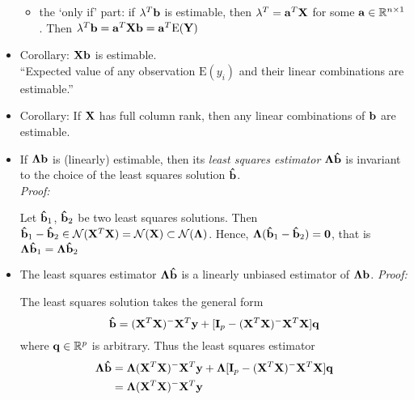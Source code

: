 \begin{itemize}
\begin{pf}
\begin{itemize}
			\item the `only if' part: if $\mathbf{\lambda}^T \mathbf{b}$ is estimable, then $\mathbf{\lambda}^T = \mathbf{a}^T\mathbf{X}$ for some $\mathbf{a} \in \mathbb{R}^{n \times 1}$. Then $\mathbf{\lambda}^T \mathbf{b} = \mathbf{a}^T\mathbf{Xb} = \mathbf{a}^T \mbox{E}(\mathbf{Y})$
		\end{itemize}
	\end{pf}
	\item Corollary: $\mathbf{Xb}$ is estimable.\\
	``Expected value of any observation $\mbox{E}(y_i)$ and their linear combinations are estimable.''
	\item Corollary: If $\mathbf{X}$ has full column rank, then any linear combinations of $\mathbf{b}$ are estimable.
	\item If $\mathbf{\Lambda b}$ is (linearly) estimable, then its {\it least squares estimator} $\mathbf{\Lambda \hat{b}}$ is invariant to the choice of the least squares solution $\mathbf{\hat{b}}$.\\
	{\it Proof:}
	\begin{pf}
		Let $\mathbf{\hat{b}}_1$, $\mathbf{\hat{b}}_2$ be two least squares solutions. Then $\mathbf{\hat{b}}_1 - \mathbf{\hat{b}}_2 \in \mathcal{N}(\mathbf{X}^T\mathbf{X}) = \mathcal{N}(\mathbf{X}) \subset \mathcal{N}(\mathbf{\Lambda})$.
		Hence, $\mathbf{\Lambda}(\mathbf{\hat{b}}_1 - \mathbf{\hat{b}}_2) = \mathbf{0}$, that is $\mathbf{\Lambda}\mathbf{\hat{b}}_1 = \mathbf{\Lambda}\mathbf{\hat{b}}_2$
	\end{pf}
	\item The least squares estimator $\mathbf{\Lambda \hat{b}}$ is a linearly unbiased estimator of $\mathbf{\Lambda b}$.
	{\it Proof:}
	\begin{pf}
		The least squares solution takes the general form
		$$
		\mathbf{\hat{b}} = (\mathbf{X}^T\mathbf{X})^-\mathbf{X}^T \mathbf{y} + [\mathbf{I}_p -  (\mathbf{X}^T\mathbf{X})^-\mathbf{X}^T\mathbf{X}]\mathbf{q}
		$$
		where $\mathbf{q}\in \mathbb{R}^p$ is arbitrary.
		Thus the least squares estimator
		$$
		\begin{aligned}
			\mathbf{\Lambda \hat{b}} &= \mathbf{\Lambda} (\mathbf{X}^T\mathbf{X})^-\mathbf{X}^T \mathbf{y} + \mathbf{\Lambda} [\mathbf{I}_p -  (\mathbf{X}^T\mathbf{X})^-\mathbf{X}^T\mathbf{X}]\mathbf{q}\\
			&=  \mathbf{\Lambda} (\mathbf{X}^T\mathbf{X})^-\mathbf{X}^T \mathbf{y} \\
		\end{aligned}
$$
\end{pf}
\end{itemize}
